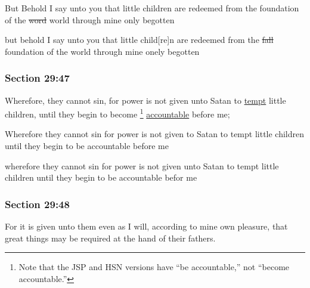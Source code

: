 		\begin{framed}
		\scriptsize
			\begin{compactdesc}
				\item[JSP] But Behold I say unto you that little children are redeemed from the foundation of the \sout{word} world through mine only begotten
				\item[HSN] but behold I say unto you that little child[re]n are redeemed from the \sout{fall} foundation of the world through mine onely begotten
			\end{compactdesc}
		\end{framed}

	\subsubsection{Section 29:47} %
		\label{DC29-47}

		Wherefore, they cannot sin, for power is not given unto Satan to \hyperref[TEMPTATION]{tempt} little children, until they begin to become%
			\footnote{%
				Note that the JSP and HSN versions have ``be accountable,'' not ``become accountable.''
				}
		\hyperref[ACCOUNTABILITY]{accountable} before me;

		\begin{framed}
		\scriptsize
			\begin{compactdesc}
				\item[JSP] Wherefore they cannot sin for power is not given to Satan to tempt little children until they begin to be accountable before me
				\item[HSN] wherefore they cannot sin for power is not given unto Satan to tempt little children until they begin to be accountable befor me
			\end{compactdesc}
		\end{framed}

	\subsubsection{Section 29:48} %
		\label{DC29-48}

		For it is given unto them even as I will, according to mine own pleasure, that great things may be required at the hand of their fathers.

